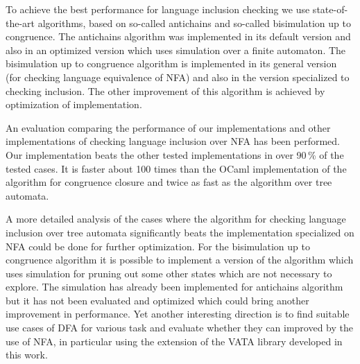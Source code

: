 To achieve the best performance for language inclusion checking we use state-of-the-art algorithms, based on so-called antichains and so-called bisimulation
up to congruence. The antichains algorithm was implemented in its default version and also in an optimized version which uses simulation over a finite automaton. 
The bisimulation up to congruence algorithm is implemented in its general version (for checking language equivalence of NFA) and also in
the version specialized to checking inclusion. %
The other improvement of this algorithm is achieved by optimization of implementation.

An evaluation comparing the performance of our implementations and other implementations of checking language inclusion over NFA has been performed.
Our implementation beats the other tested implementations in over 90\,\% of the tested cases. It is faster about 100 times than the OCaml implementation of the
algorithm for congruence closure and twice as fast as the algorithm over tree automata.

A more detailed analysis of the cases where the algorithm for checking language inclusion over tree automata significantly 
beats the implementation specialized on NFA could be done for further optimization. 
For the bisimulation up to congruence algorithm it is possible to implement a version of the algorithm 
which uses simulation for pruning out some other states which are not necessary to explore. The simulation has already been implemented for antichains 
algorithm but it has not been evaluated and optimized which could bring another improvement in performance. 
Yet another interesting direction is to find suitable use cases of DFA for various task and evaluate whether they can improved by the use of NFA, in
particular using the extension of the VATA library developed in this work.
